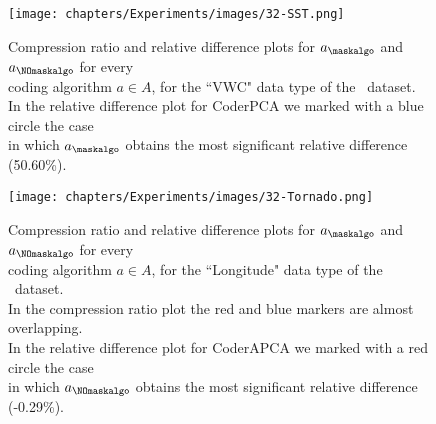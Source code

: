 
\newcommand{\commonfigurescomp}{Compression ratio and relative difference plots for $a_\maskalgo$ and $a_\NOmaskalgo$ for every\\coding algorithm $a \in A$, for the }

\begin{figure}
\hspace{-70pt}
\texttt{[image: chapters/Experiments/images/32-SST.png]}
\hspace{+10pt}
\caption{\commonfigurescomp ``VWC" data type of the \datasetsst \ dataset.\\In the relative difference plot for CoderPCA we marked with a blue circle the case\\in which $a_\maskalgo$ obtains the most significant relative difference (50.60\%).}
\label{fig:diff-sst}
\end{figure}

\clearpage

\begin{figure}
\hspace{-70pt}
\texttt{[image: chapters/Experiments/images/32-Tornado.png]}
\hspace{+10pt}
\caption{\commonfigurescomp ``Longitude" data type of the \datasettornado \ dataset.\\In the compression ratio plot the red and blue markers are almost overlapping.\\In the relative difference plot for CoderAPCA we marked with a red circle the case\\in which $a_\NOmaskalgo$ obtains the most significant relative difference (-0.29\%).}
\label{fig:diff-tornado}
\end{figure}
